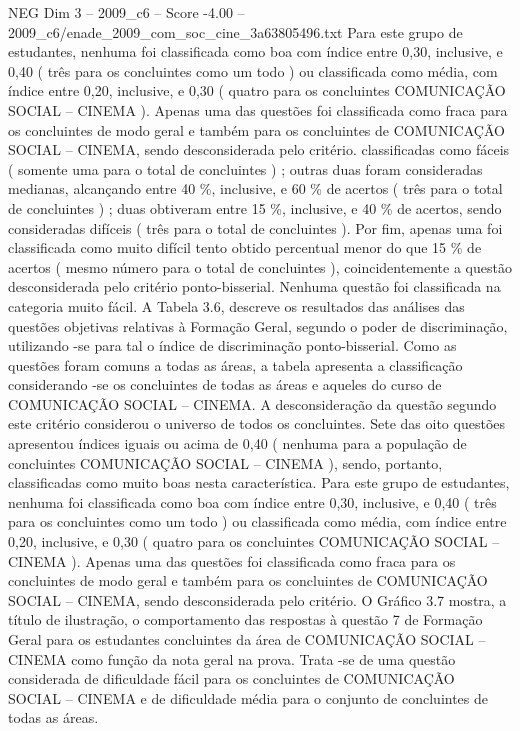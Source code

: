 \begin{textsample}{NEG Dim 3 – 2009\_c6 – Score -4.00 – 2009\_c6/enade\_2009\_com\_soc\_cine\_3a63805496.txt}
Para este grupo de estudantes, nenhuma foi classificada como boa com índice entre 0,30, inclusive, e 0,40 ( três para os concluintes como um todo ) ou classificada como média, com índice entre 0,20, inclusive, e 0,30 ( quatro para os concluintes COMUNICAÇÃO SOCIAL – CINEMA ).
Apenas uma das questões foi classificada como fraca para os concluintes de modo geral e também para os concluintes de COMUNICAÇÃO SOCIAL – CINEMA, sendo desconsiderada pelo critério. classificadas como fáceis ( somente uma para o total de concluintes ) ; outras duas foram consideradas medianas, alcançando entre 40 \%, inclusive, e 60 \% de acertos ( três para o total de concluintes ) ; duas obtiveram entre 15 \%, inclusive, e 40 \% de acertos, sendo consideradas difíceis ( três para o total de concluintes ).
Por fim, apenas uma foi classificada como muito difícil tento obtido percentual menor do que 15 \% de acertos ( mesmo número para o total de concluintes ), coincidentemente a questão desconsiderada pelo critério ponto-bisserial.
Nenhuma questão foi classificada na categoria muito fácil.
A Tabela 3.6, descreve os resultados das análises das questões objetivas relativas à Formação Geral, segundo o poder de discriminação, utilizando -se para tal o índice de discriminação ponto-bisserial.
Como as questões foram comuns a todas as áreas, a tabela apresenta a classificação considerando -se os concluintes de todas as áreas e aqueles do curso de COMUNICAÇÃO SOCIAL – CINEMA.
A desconsideração da questão segundo este critério considerou o universo de todos os concluintes.
Sete das oito questões apresentou índices iguais ou acima de 0,40 ( nenhuma para a população de concluintes COMUNICAÇÃO SOCIAL – CINEMA ), sendo, portanto, classificadas como muito boas nesta característica.
Para este grupo de estudantes, nenhuma foi classificada como boa com índice entre 0,30, inclusive, e 0,40 ( três para os concluintes como um todo ) ou classificada como média, com índice entre 0,20, inclusive, e 0,30 ( quatro para os concluintes COMUNICAÇÃO SOCIAL – CINEMA ).
Apenas uma das questões foi classificada como fraca para os concluintes de modo geral e também para os concluintes de COMUNICAÇÃO SOCIAL – CINEMA, sendo desconsiderada pelo critério.
O Gráfico 3.7 mostra, a título de ilustração, o comportamento das respostas à questão 7 de Formação Geral para os estudantes concluintes da área de COMUNICAÇÃO SOCIAL – CINEMA como função da nota geral na prova.
Trata -se de uma questão considerada de dificuldade fácil para os concluintes de COMUNICAÇÃO SOCIAL – CINEMA e de dificuldade média para o conjunto de concluintes de todas as áreas.

\end{textsample}
